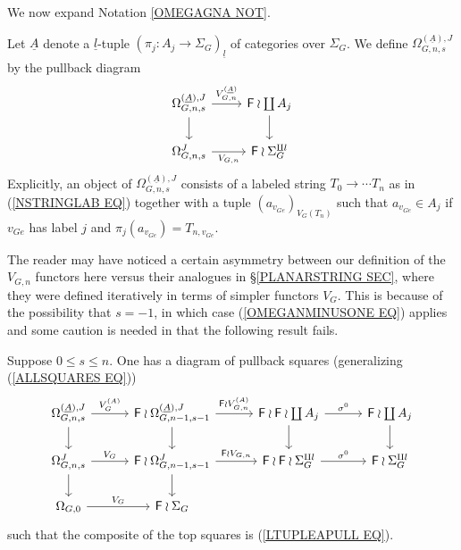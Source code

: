 \documentclass[a4paper,10pt]{article}%
\begin{document}
We now expand Notation \ref{OMEGAGNA NOT}.

\begin{notation}
  Let $\underline{A}$ denote a $\underline{l}$-tuple 
  $(\pi_j \colon A_j \to \Sigma_G)_{\underline{l}}$ of categories over $\Sigma_G$. We define $\Omega_{G,n,s}^{(\underline{A}),J}$ by the pullback diagram
  \begin{equation}\label{LTUPLEAPULL EQ}
    \begin{tikzcd}
      \Omega_{G,n,s}^{(\underline{A}),J} \ar{r}{V_{G,n}^{(\underline{A})}} \ar{d}& 
      \Fin \wr \coprod A_j \ar{d}
      \\
      \Omega_{G,n,s}^{J} \ar{r}[swap]{V_{G,n}} & 
      \Fin \wr \Sigma_G^{\amalg l} 
    \end{tikzcd}
  \end{equation}
  Explicitly, an object of $\Omega_{G,n,s}^{(\underline{A}),J}$ consists of a labeled string $T_0 \to \cdots T_n$ as in (\ref{NSTRINGLAB EQ})
  together with 
  a tuple $(a_{v_{Ge}})_{V_G(T_n)}$ such that
  $a_{v_{Ge}} \in A_j$ if $v_{Ge}$ has label $j$ and 
  $\pi_j (a_{v_{Ge}}) = T_{n,v_{Ge}}$.
\end{notation}


The reader may have noticed a certain asymmetry between our definition of the $V_{G,n}$ functors here versus their analogues in \S \ref{PLANARSTRING SEC}, where they were defined iteratively in terms of simpler functors $V_G$. This is because of the possibility that $s=-1$, in which case (\ref{OMEGANMINUSONE EQ}) applies and some caution is needed in that the following result fails.


\begin{proposition}\label{ALLSQUARESJ PROP}
  Suppose $0\leq s \leq n$. One has a diagram of pullback squares
  (generalizing (\ref{ALLSQUARES EQ}))
  \begin{equation}\label{ALLSQUARESJ EQ}
    \begin{tikzcd}[column sep = 3em]
      \Omega^{(\underline{A}),J}_{G,n,s} \ar{r}{V_G^{(A)}} \ar{d}& 
      \Fin \wr \Omega^{(\underline{A}),J}_{G,n-1,s-1} \ar{r}{\Fin \wr V_{G,n}^{(A)}} \ar{d}&
      \Fin \wr \Fin \wr \coprod A_j  \ar{d} \ar{r}{\sigma^0} &
      \Fin \wr \coprod A_j \ar{d}
      \\
      \Omega_{G,n,s}^J \ar{r}{V_G} \ar{d} &
      \Fin \wr \Omega_{G,n-1,s-1}^J \ar{r}{\Fin \wr V_{G,n}} \ar{d} &
      \Fin \wr \Fin \wr \Sigma_G^{\amalg l} \ar{r}{\sigma^0} &
      \Fin \wr \Sigma_G^{\amalg l}
      \\
      \Omega_{G,0} \ar{r}{V_G} &
      \Fin \wr \Sigma_G
    \end{tikzcd}
  \end{equation}
  such that the composite of the top squares is (\ref{LTUPLEAPULL EQ}).
\end{proposition}
\end{document}
